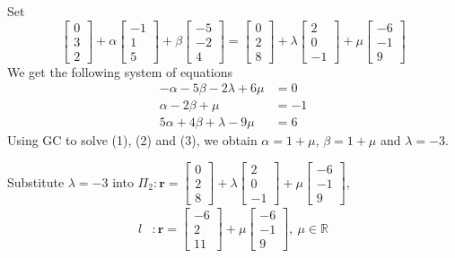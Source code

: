 \documentclass[11pt,a4paper]{book}
\newcommand{\R}{\mathbb{R}}
\begin{document}
\begin{example}
Set
\[
\begin{bmatrix}0\\
3\\
2
\end{bmatrix}+\alpha\begin{bmatrix}-1\\
1\\
5
\end{bmatrix}+\beta\begin{bmatrix}-5\\
-2\\
4
\end{bmatrix}=\begin{bmatrix}0\\
2\\
8
\end{bmatrix}+\lambda\begin{bmatrix}2\\
0\\
-1
\end{bmatrix}+\mu\begin{bmatrix}-6\\
-1\\
9
\end{bmatrix}
\]
We get the following system of equations
\begin{align*}
-\alpha-5\beta-2\lambda+6\mu & =0\tag{1}\\
\alpha-2\beta+\mu & =-1\tag{2}\\
5\alpha+4\beta+\lambda-9\mu & =6\tag{3}
\end{align*}
Using GC to solve (1), (2) and (3), we obtain $\alpha=1+\mu$, $\beta=1+\mu$
and $\lambda=-3$.

Substitute $\lambda=-3$ into $\Pi_{2}:\textbf{r}=\begin{bmatrix}0\\
2\\
8
\end{bmatrix}+\lambda\begin{bmatrix}2\\
0\\
-1
\end{bmatrix}+\mu\begin{bmatrix}-6\\
-1\\
9
\end{bmatrix}$,
\begin{align*}
l & :\textbf{r}=\begin{bmatrix}-6\\
2\\
11
\end{bmatrix}+\mu\begin{bmatrix}-6\\
-1\\
9
\end{bmatrix},\:\mu\in\R
\end{align*}

\end{example}
\end{document}
